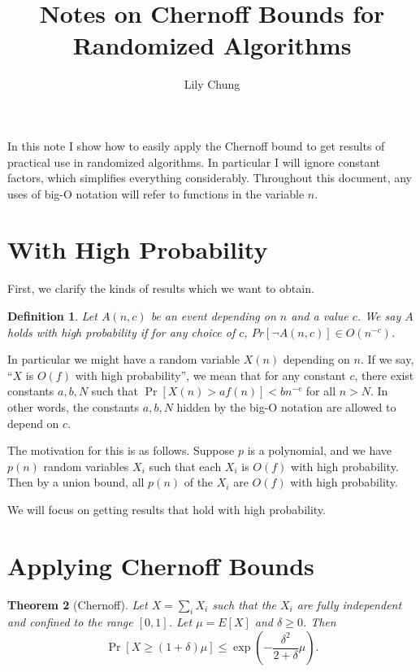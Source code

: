\documentclass{article}
\title{Notes on Chernoff Bounds for Randomized Algorithms}
\author{Lily Chung}
\date{}
\newtheorem{theorem}{Theorem}
\newtheorem{definition}[theorem]{Definition}
\newcommand*{\defn}[1]{\emph{#1}}
\begin{document}
\maketitle

In this note I show how to easily apply the Chernoff bound to get results of practical use in randomized algorithms.
In particular I will ignore constant factors, which simplifies everything considerably.
Throughout this document, any uses of big-O notation will refer to functions in the variable \(n\).

\section{With High Probability}

First, we clarify the kinds of results which we want to obtain.

\begin{definition}
  Let \(A(n, c)\) be an event depending on \(n\) and a value \(c\).
  We say \(A\) holds \defn{with high probability} if
  for any choice of \(c\),
  \(Pr[\neg A(n, c)] \in O(n^{-c})\).
\end{definition}

In particular we might have a random variable \(X(n)\) depending on \(n\).
If we say, ``\(X\) is \(O(f)\) with high probability'',
we mean that for any constant \(c\), there exist constants \(a, b, N\) such that
\(\Pr[X(n) > af(n)] < bn^{-c}\) for all \(n > N\).
In other words, the constants \(a, b, N\) hidden by the big-O notation are allowed to depend on \(c\).

The motivation for this is as follows.
Suppose \(p\) is a polynomial, and we have \(p(n)\) random variables \(X_i\)
such that each \(X_i\) is \(O(f)\) with high probability.
Then by a union bound, all \(p(n)\) of the \(X_i\) are \(O(f)\) with high probability.

We will focus on getting results that hold with high probability.

\section{Applying Chernoff Bounds}

\begin{theorem}[Chernoff]
  \label{thm:chernoff}
  Let \(X = \sum_i X_i\) such that the \(X_i\) are fully independent and confined to the range \([0, 1]\).
  Let \(\mu = E[X]\) and \(\delta \ge 0\).
  Then \[\Pr[X \ge (1 + \delta)\mu] \le \exp\left(-\frac{\delta^2}{2+\delta}\mu\right).\]
\end{theorem}
\end{document}
